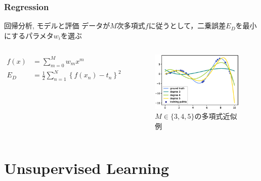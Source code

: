 \documentclass[dvipdfmx,platex]{beamer}
\begin{document}
\section{Regression}
\begin{frame}{回帰分析, モデルと評価}
  データが$M$次多項式$f$に従うとして，二乗誤差$E_D$を最小にするパラメタ$w_{\textit{i}}$を選ぶ
  \begin{columns}[T,onlytextwidth]
    \begin{align*}
      f(x)&=\sum_{m=0}^{M}w_mx^{m}\\
      E_{D}&=\frac{1}{2}\sum_{n=1}^{N}{\left\{f(x_n)-t_n\right\}}^2
    \end{align*}
    \begin{figure}
      \centering
      \includegraphics[width=5cm]{fig/polyreg.eps}
      \caption{$M\in\{3,4,5\}${\mgfamily の多項式近似例}}
    \end{figure}
  \end{columns}
\end{frame}
\part{Unsupervised Learning}
\end{document}
